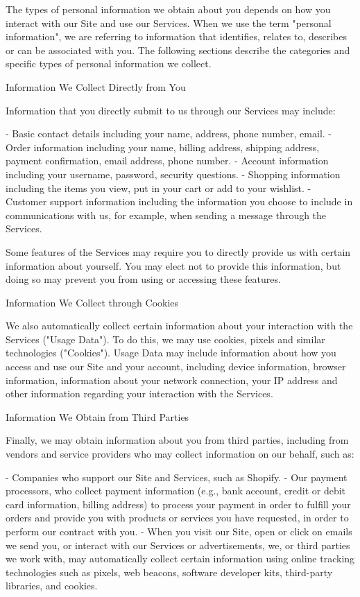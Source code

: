 \documentclass[conference]{IEEEtran}
\begin{document}
The types of personal information we obtain about you depends on how you interact with our Site and use our Services. When we use the term "personal information", we are referring to information that identifies, relates to, describes or can be associated with you. The following sections describe the categories and specific types of personal information we collect.

Information We Collect Directly from You

Information that you directly submit to us through our Services may include:

- Basic contact details including your name, address, phone number, email.
- Order information including your name, billing address, shipping address, payment confirmation, email address, phone number.
- Account information including your username, password, security questions.
- Shopping information including the items you view, put in your cart or add to your wishlist.
- Customer support information including the information you choose to include in communications with us, for example, when sending a message through the Services.

Some features of the Services may require you to directly provide us with certain information about yourself. You may elect not to provide this information, but doing so may prevent you from using or accessing these features.

Information We Collect through Cookies

We also automatically collect certain information about your interaction with the Services ("Usage Data"). To do this, we may use cookies, pixels and similar technologies ("Cookies"). Usage Data may include information about how you access and use our Site and your account, including device information, browser information, information about your network connection, your IP address and other information regarding your interaction with the Services.

Information We Obtain from Third Parties

Finally, we may obtain information about you from third parties, including from vendors and service providers who may collect information on our behalf, such as:

- Companies who support our Site and Services, such as Shopify.
- Our payment processors, who collect payment information (e.g., bank account, credit or debit card information, billing address) to process your payment in order to fulfill your orders and provide you with products or services you have requested, in order to perform our contract with you.
- When you visit our Site, open or click on emails we send you, or interact with our Services or advertisements, we, or third parties we work with, may automatically collect certain information using online tracking technologies such as pixels, web beacons, software developer kits, third-party libraries, and cookies.
\end{document}
